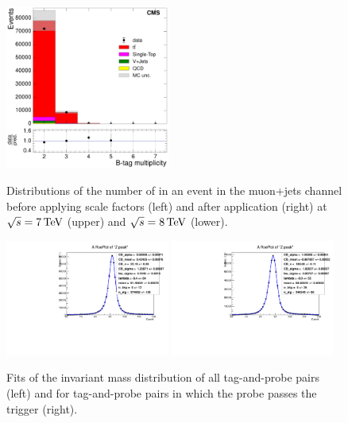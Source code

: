 \begin{figure}[hbtp]
      \includegraphics[width=0.48\textwidth]{Chapters/04_Analysis/04b_XSections/images/control_plots/before_fit/8TeV/MuPlusJets_N_BJets_reweighted_with_ratio}\\
     \caption{Distributions of the number of \btags in an event in the muon+jets channel before applying
     \btag scale factors (left) and after application (right) at $\sqrt{s}=7\,\text{Te\hspace{-.08em}V}$
     (upper) and $\sqrt{s}=8\,\text{Te\hspace{-.08em}V}$ (lower).}
     \label{fig:nbjets_before_and_after_btag_scale_factors_muons}
\end{figure}

\begin{figure}[hbtp]
    \centering
      \includegraphics[width=0.48\textwidth]{Chapters/04_Analysis/04b_XSections/images/lepton_scale_factors/CBConvolution/electron/data/trigger/tagProbe_total_Z_peak}\hfill
      \includegraphics[width=0.48\textwidth]{Chapters/04_Analysis/04b_XSections/images/lepton_scale_factors/CBConvolution/electron/data/trigger/tagProbe_passed_hlt_Z_peak}\\
     \caption{Fits of the invariant mass distribution of all tag-and-probe pairs (left) and for
     tag-and-probe pairs in which the probe passes the trigger (right).}
     \label{fig:electron_trigger_efficiency_invariant_Z_mass_fits}
\end{figure}

